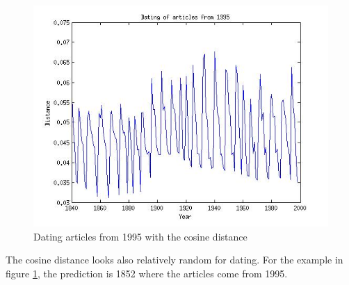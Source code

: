 \begin{figure}[H]
\begin{minipage}[b]{0.3\linewidth}
	\includegraphics[scale=0.25]{Pictures/date_articles/cos/dating1995_corrected.jpg}
        \caption{Dating articles from 1995 with the cosine distance}
        \label{date_cos}
    \end{minipage}
\end{figure}
The cosine distance looks also relatively random for dating. For the example in figure \ref{date_cos}, the prediction is 1852 where the articles come from 1995.